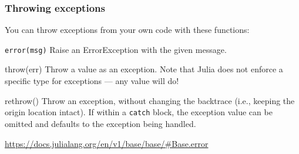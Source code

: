 \documentclass[english,serif,mathserif,xcolor=pdftex,dvipsnames,table]{beamer}
\begin{document}
\begin{frame}[fragile]
  \frametitle{Throwing exceptions}
  \smaller
  You can throw exceptions from your own code with these functions:

  \+
  \begin{describe}{\lstinline|error(msg)|}
    Raise an ErrorException with the given message.
  \end{describe}

  \+
  \begin{describe}{throw(err)}
    Throw a value as an exception.  Note that Julia does not enforce a
    specific type for exceptions --- any value will do!
  \end{describe}

  \+
  \begin{describe}{rethrow()}
    Throw an exception, without changing the backtrace (i.e., keeping
    the origin location intact).  If within a \texttt{catch} block,
    the exception value can be omitted and defaults to the exception
    being handled.
  \end{describe}

  \+
  \begin{references}
    \url{https://docs.julialang.org/en/v1/base/base/#Base.error}
  \end{references}
\end{frame}
\end{document}
